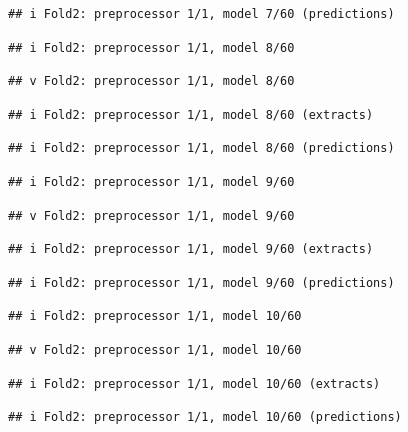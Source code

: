 \documentclass[
]{article}
\begin{document}
\begin{verbatim}
## i Fold2: preprocessor 1/1, model 7/60 (predictions)
\end{verbatim}

\begin{verbatim}
## i Fold2: preprocessor 1/1, model 8/60
\end{verbatim}

\begin{verbatim}
## v Fold2: preprocessor 1/1, model 8/60
\end{verbatim}

\begin{verbatim}
## i Fold2: preprocessor 1/1, model 8/60 (extracts)
\end{verbatim}

\begin{verbatim}
## i Fold2: preprocessor 1/1, model 8/60 (predictions)
\end{verbatim}

\begin{verbatim}
## i Fold2: preprocessor 1/1, model 9/60
\end{verbatim}

\begin{verbatim}
## v Fold2: preprocessor 1/1, model 9/60
\end{verbatim}

\begin{verbatim}
## i Fold2: preprocessor 1/1, model 9/60 (extracts)
\end{verbatim}

\begin{verbatim}
## i Fold2: preprocessor 1/1, model 9/60 (predictions)
\end{verbatim}

\begin{verbatim}
## i Fold2: preprocessor 1/1, model 10/60
\end{verbatim}

\begin{verbatim}
## v Fold2: preprocessor 1/1, model 10/60
\end{verbatim}

\begin{verbatim}
## i Fold2: preprocessor 1/1, model 10/60 (extracts)
\end{verbatim}

\begin{verbatim}
## i Fold2: preprocessor 1/1, model 10/60 (predictions)
\end{verbatim}
\end{document}
